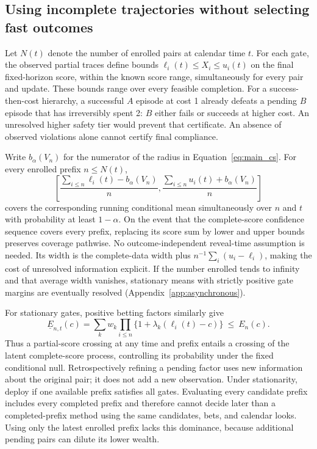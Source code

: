\documentclass[11pt,letterpaper]{article}
\begin{document}
\subsection{Using incomplete trajectories without selecting fast outcomes}
\label{sec:partial}
Let $N(t)$ denote the number of enrolled pairs at calendar time $t$.
For each gate, the observed partial traces define bounds
$\ell_i(t)\leq X_i\leq u_i(t)$ on the final fixed-horizon score,
within the known score range, simultaneously for every pair and update.
These bounds range over every
feasible completion. For a success-then-cost hierarchy, a successful
$A$ episode at cost 1 already defeats a pending $B$ episode that has
irreversibly spent 2: $B$ either fails or succeeds at higher cost.
An unresolved higher safety tier would prevent that certificate.
An absence of observed violations alone cannot certify final compliance.

Write $b_\alpha(V_n)$ for the numerator of the radius in
Equation~\eqref{eq:main_cs}. For every enrolled prefix $n\leq N(t)$,
\begin{equation}
 \left[\frac{\sum_{i\leq n}\ell_i(t)-b_\alpha(V_n)}{n},
       \frac{\sum_{i\leq n}u_i(t)+b_\alpha(V_n)}{n}\right]
 \label{eq:main_partial_cs}
\end{equation}
covers the corresponding running conditional mean simultaneously over
$n$ and $t$ with probability at least $1-\alpha$. On the event that
the complete-score confidence sequence covers every prefix, replacing
its score sum by lower and upper bounds preserves coverage pathwise.
No outcome-independent reveal-time assumption is needed. Its width is
the complete-data width plus $n^{-1}\sum_i(u_i-\ell_i)$, making the
cost of unresolved information explicit. If the number enrolled tends to infinity and that average width vanishes,
stationary means with strictly positive gate margins are eventually
resolved (Appendix~\ref{app:asynchronous}).

For stationary gates, positive betting factors similarly give
\begin{equation}
 \underline E_{n,t}(c)=\sum_k w_k\prod_{i\leq n}
            \{1+\lambda_k(\ell_i(t)-c)\}\ \leq\ E_n(c).
 \label{eq:main_partial_wealth}
\end{equation}
Thus a partial-score crossing at any time and prefix entails a crossing
of the latent complete-score process, controlling its probability under
the fixed conditional null. Retrospectively refining a pending factor
uses new information about the original pair; it does not add a new
observation. Under stationarity, deploy if one available prefix satisfies
all gates. Evaluating every candidate prefix includes every completed
prefix and therefore cannot decide later than a completed-prefix method
using the same candidates, bets, and calendar looks. Using only the
latest enrolled prefix lacks this dominance, because additional pending
pairs can dilute its lower wealth.
\end{document}
